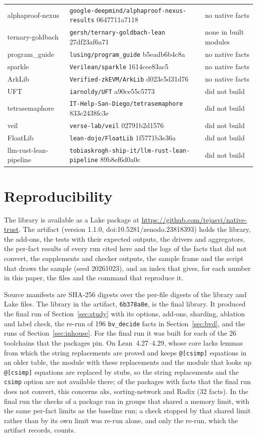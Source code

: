 \documentclass[11pt]{article}
\begin{document}
\begin{tabular}{lll}
alphaproof-nexus & \texttt{google-deepmind/alphaproof-nexus-results} 0647711a7118 & no native facts\\
ternary-goldbach & \texttt{gersh/ternary-goldbach-lean} 27df23af6a71 & none in built modules\\
program\_guide & \texttt{lusing/program\_guide} b5eadb6b4c8a & no native facts\\
sparkle & \texttt{Verilean/sparkle} 1614cee83ac5 & no native facts\\
ArkLib & \texttt{Verified-zkEVM/ArkLib} d023c5d31d76 & no native facts\\
UFT & \texttt{iarnoldy/UFT} a90ce55c5773 & did not build\\
tetrasemaphore & \texttt{IT-Help-San-Diego/tetrasemaphore} 833c2438fc3e & did not build\\
veil & \texttt{verse-lab/veil} 02791b2d1576 & did not build\\
FloatLib & \texttt{lean-dojo/FloatLib} 1f5771b3e36a & did not build\\
llm-rust-lean-pipeline & \texttt{tobiaskrogh-ship-it/llm-rust-lean-pipeline} 89b8ef6d0a0c & did not build\\\bottomrule
\end{tabular}
\normalsize

\section{Reproducibility}\label{app:repro}
The library is available as a Lake package at \url{https://github.com/tejasvi/native-trust}.
The artifact (version 1.1.0, doi:10.5281/zenodo.23818393) holds the library, the add-ons, the tests with their expected
outputs, the drivers and aggregators, the per-fact results of every run cited here and the logs of the facts
that did not convert, the supplements and checker outputs, the sample frame and the script that draws the
sample (seed 20261023), and an index that gives, for each number in this paper, the files and the command that
reproduce it.

Source manifests are SHA-256 digests over the per-file digests of the library and Lake files. The library in
the artifact, \texttt{6b378a8e}, is the final library. It produced the final run of Section~\ref{sec:study}
with its options, add-ons, sharding, ablation and label check, the re-run of 196 \texttt{bv\_decide} facts
in Section~\ref{sec:bvd}, and the runs of Section~\ref{sec:inhouse}. For the final run it was built for each
of the 26 toolchains that the packages pin. On Lean~4.27--4.29, whose core lacks lemmas from which the
string replacements are proved and keeps \verb|@[csimp]| equations in an older table, the module with these
replacements and the module that looks up \verb|@[csimp]| equations are replaced by stubs, so the string
replacements and the \texttt{csimp} option are not available there; of the packages with facts
that the final run does not convert, this concerns aks, sorting-network and Radix (32 facts). In the final
run the checks of a package ran in groups that shared a
memory limit, with the same per-fact limits as the baseline run; a check stopped by that shared limit rather
than by its own limit was re-run alone, and only the re-run, which the artifact records, counts.
\end{document}
